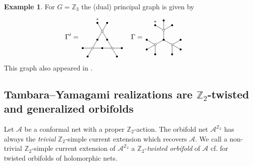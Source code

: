 \documentclass[twoside,11pt,reqno]{amsart}
\makeatletter
\theoremstyle{definition}
\newtheorem{example}[thm]{Example}
\theoremstyle{remark}
\newcommand{\A}{\mathcal{A}}
\newcommand{\ZZ}{\mathbb{Z}}
\DeclareRobustCommand{\cf}{cf.\@\xspace}
\newcommand{\myemph}[1]{\emph{#1}}
\newcommand{\tikzmath}[2][0.50]
{\vcenter{\hbox{\begin{tikzpicture}[scale=#1] #2\end{tikzpicture}}}
}
\makeatother
\begin{document}
\begin{example} For $G=\ZZ_3$ the (dual) principal graph is given by
  \begin{align}
    \Gamma'&=
    \tikzmath[.5]{
      \draw (-1,0)--(1,0)--(0,1.732)--(-1,0);
      \draw (-1,0)--+(180:1) node (a) {}
        (-1,0)--+(240:1) node (b) {};
      \draw (1,0)--+(0:1)  node (d) {}
        (1,0)--+(-60:1)  node (e) {};
     \draw (0,1.732)--+(60:1)  node (g) {}
      (0,1.732)--+(120:1)  node (h) {};
      \fill 
        (a) circle (.1)
        (b) circle (.1)
        (d) circle (.1)
        (e) circle (.1)
        (g) circle (.1) 
        (h) circle (.1) node [above] {$\scriptstyle\ast$}
        (0,0) circle (.1)
        (0.5,.866) circle (.1)
        (-0.5,.866) circle (.1)
      ;
      \draw[fill=white] 
        (-1,0) circle (.1)
        (1,0) circle (.1)
        (0,1.732) circle (.1)
      ;
    }
    &
    \Gamma&=
    \tikzmath[.5]{
      \draw 
        (0,0) node (j) {} -- (0,1) node (o) {}
        (0,0)-- (-.866,-.5) node (p) {}
        (0,0)-- (.866,-.5) node (q) {}
      ;
      \draw (0,1)--+(90:1) node (a) {}
        (0,1)--+(30:1) node (b) {}
        (0,1)--+(150:1) node (c) {};
     \draw (.866,-.5)--+(330:1) node (d) {}
        (.866,-.5)--+(270:1) node (e) {}
        (.866,-.5)--+(30:1) node (f) {};
     \draw (-.866,-.5)--+(150:1) node (g) {}
        (-.866,-.5)--+(210:1) node (h) {}
        (-.866,-.5)--+(270:1) node (i) {};
      \fill 
        (a) circle (.1)
        (b) circle (.1) 
        (c) circle (.1) node [above] {$\scriptstyle\ast$}
        (d) circle (.1)
        (e) circle (.1)
        (f) circle (.1)
        (g) circle (.1)
        (h) circle (.1)
        (i) circle (.1)
        (j) circle (.1)
      ;
      \draw[fill=white] 
        (o) circle (.1)
        (p) circle (.1)
        (q) circle (.1)
      ;
    }
  \end{align}
  This graph also appeared in \cite{Bu2015}.
\end{example}

\subsection{Tambara--Yamagami realizations are $\ZZ_2$-twisted
and generalized orbifolds}
\label{ssec:TYareTwistedOrbifolds}
Let $\A$ be a conformal net with a proper $\ZZ_2$-action.
The orbifold net $\A^{\ZZ_2}$ has always the
\emph{trivial} $\ZZ_2$-simple current extension which recovers $\A$.
We call a non-trivial $\ZZ_2$-simple current extension of $\A^{\ZZ_2}$
a $\ZZ_2$-\myemph{twisted orbifold} of $\A$ \cf \cite[Section 3]{KaLo2006}
for twisted orbifolds of holomorphic nets.
\end{document}
